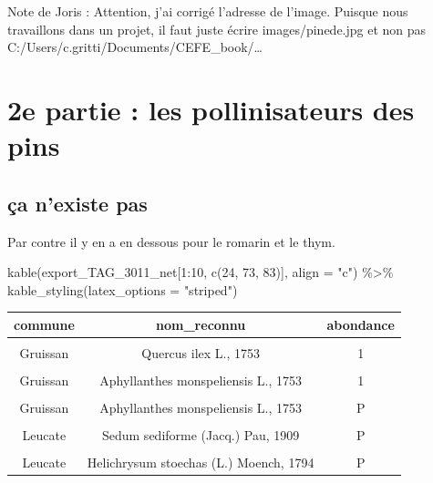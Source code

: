 \documentclass[
  12pt,
  american,
  a4paper,
  extrafontsizes,onecolumn,openright
  ]{memoir}
\newenvironment{Shaded}{\begin{snugshade}}{\end{snugshade}}
\newcommand{\AttributeTok}[1]{\textcolor[rgb]{0.77,0.63,0.00}{#1}}
\newcommand{\DecValTok}[1]{\textcolor[rgb]{0.00,0.00,0.81}{#1}}
\newcommand{\FunctionTok}[1]{\textcolor[rgb]{0.00,0.00,0.00}{#1}}
\newcommand{\NormalTok}[1]{#1}
\newcommand{\SpecialCharTok}[1]{\textcolor[rgb]{0.00,0.00,0.00}{#1}}
\newcommand{\StringTok}[1]{\textcolor[rgb]{0.31,0.60,0.02}{#1}}
\begin{document}
Note de Joris : Attention, j'ai corrigé l'adresse de l'image. Puisque nous travaillons dans un projet, il faut juste écrire images/pinede.jpg et non pas C:/Users/c.gritti/Documents/CEFE\_book/\ldots{}

\hypertarget{e-partie-les-pollinisateurs-des-pins}{%
\chapter{2e partie : les pollinisateurs des pins}\label{e-partie-les-pollinisateurs-des-pins}}

\hypertarget{uxe7a-nexiste-pas}{%
\section{ça n'existe pas}\label{uxe7a-nexiste-pas}}

Par contre il y en a en dessous pour le romarin et le thym.

\scriptsize

\begin{Shaded}
\begin{Highlighting}[]
\FunctionTok{kable}\NormalTok{(export\_TAG\_3011\_net[}\DecValTok{1}\SpecialCharTok{:}\DecValTok{10}\NormalTok{, }\FunctionTok{c}\NormalTok{(}\DecValTok{24}\NormalTok{, }\DecValTok{73}\NormalTok{, }\DecValTok{83}\NormalTok{)], }\AttributeTok{align =} \StringTok{"c"}\NormalTok{) }\SpecialCharTok{\%\textgreater{}\%}
    \FunctionTok{kable\_styling}\NormalTok{(}\AttributeTok{latex\_options =} \StringTok{"striped"}\NormalTok{)}
\end{Highlighting}
\end{Shaded}

\begin{table}
\centering
\begin{tabular}{c|c|c}
\hline
commune & nom\_reconnu & abondance\\
\hline
\cellcolor{gray!6}{Gruissan} & \cellcolor{gray!6}{Smilax aspera L., 1753} & \cellcolor{gray!6}{\vphantom{1} P}\\
\hline
Gruissan & Quercus ilex L., 1753 & 1\\
\hline
\cellcolor{gray!6}{Gruissan} & \cellcolor{gray!6}{Smilax aspera L., 1753} & \cellcolor{gray!6}{P}\\
\hline
Gruissan & Aphyllanthes monspeliensis L., 1753 & 1\\
\hline
\cellcolor{gray!6}{Gruissan} & \cellcolor{gray!6}{Quercus ilex L., 1753} & \cellcolor{gray!6}{P}\\
\hline
Gruissan & Aphyllanthes monspeliensis L., 1753 & P\\
\hline
\cellcolor{gray!6}{Leucate} & \cellcolor{gray!6}{Quercus ilex L., 1753} & \cellcolor{gray!6}{P}\\
\hline
Leucate & Sedum sediforme (Jacq.) Pau, 1909 & P\\
\hline
\cellcolor{gray!6}{Leucate} & \cellcolor{gray!6}{Smilax aspera L., 1753} & \cellcolor{gray!6}{P}\\
\hline
Leucate & Helichrysum stoechas (L.) Moench, 1794 & P\\
\hline
\end{tabular}
\end{table}
\end{document}

